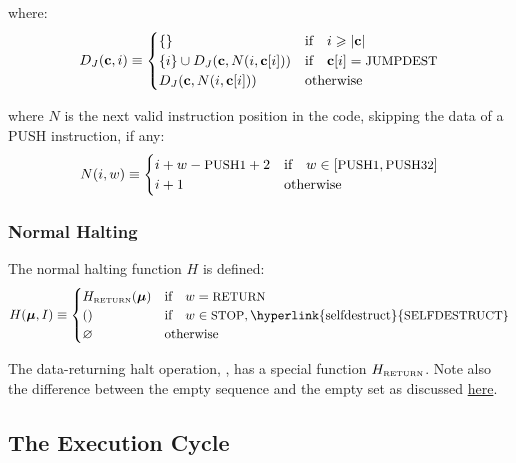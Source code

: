\documentclass[9pt,oneside]{amsart}
\begin{document}
\begin{multicols}{2}
where:
\begin{equation}
D_J(\mathbf{c}, i) \equiv \begin{cases}
\{\} & \text{if} \quad i \geqslant |\mathbf{c}|  \\
\{ i \} \cup D_J(\mathbf{c}, N(i, \mathbf{c}[i])) & \text{if} \quad \mathbf{c}[i] = \text{\small JUMPDEST} \\
D_J(\mathbf{c}, N(i, \mathbf{c}[i])) & \text{otherwise} \\
\end{cases}
\end{equation}

where $N$ is the next valid instruction position in the code, skipping the data of a {\small PUSH} instruction, if any:
\begin{equation}
N(i, w) \equiv \begin{cases}
i + w - \text{\small PUSH1} + 2 & \text{if} \quad w \in [\text{\small PUSH1}, \text{\small PUSH32}] \\
i + 1 & \text{otherwise} \end{cases}
\end{equation}

\subsubsection{Normal Halting} \label{subsec:Normal Halting}

The normal halting function $H$ is defined:
\begin{equation} \label{eq:Normal Halting}
H(\boldsymbol{\mu}, I) \equiv \begin{cases}
H_{\text{\tiny RETURN}}(\boldsymbol{\mu}) & \text{if} \quad w = \text{\small RETURN} \\
() & \text{if} \quad w \in \text{\small STOP}, \text{\hyperlink{selfdestruct}{\small SELFDESTRUCT}} \\
\varnothing & \text{otherwise}
\end{cases}
\end{equation}

The data-returning halt operation, \hyperlink{RETURN}{}, has a special function $H_{\text{\tiny RETURN}}$. Note also the difference between the empty sequence and the empty set as discussed \hyperlink{emptySequence}{here}.

\subsection{The Execution Cycle}


\end{multicols}
\end{document}
